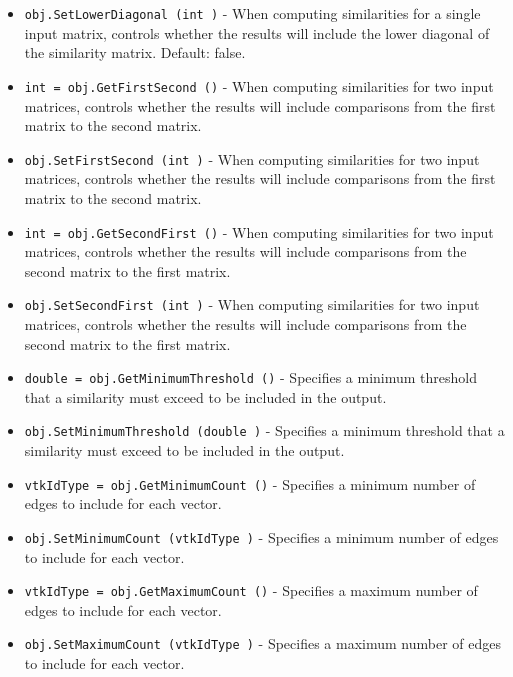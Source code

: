 \begin{itemize}
\item  \verb|obj.SetLowerDiagonal (int )| -  When computing similarities for a single input matrix, controls whether the
 results will include the lower diagonal of the similarity matrix.  Default: false.

\item  \verb|int = obj.GetFirstSecond ()| -  When computing similarities for two input matrices, controls whether the results
 will include comparisons from the first matrix to the second matrix.

\item  \verb|obj.SetFirstSecond (int )| -  When computing similarities for two input matrices, controls whether the results
 will include comparisons from the first matrix to the second matrix.

\item  \verb|int = obj.GetSecondFirst ()| -  When computing similarities for two input matrices, controls whether the results
 will include comparisons from the second matrix to the first matrix.

\item  \verb|obj.SetSecondFirst (int )| -  When computing similarities for two input matrices, controls whether the results
 will include comparisons from the second matrix to the first matrix.

\item  \verb|double = obj.GetMinimumThreshold ()| -  Specifies a minimum threshold that a similarity must exceed to be included in
 the output.

\item  \verb|obj.SetMinimumThreshold (double )| -  Specifies a minimum threshold that a similarity must exceed to be included in
 the output.

\item  \verb|vtkIdType = obj.GetMinimumCount ()| -  Specifies a minimum number of edges to include for each vector.

\item  \verb|obj.SetMinimumCount (vtkIdType )| -  Specifies a minimum number of edges to include for each vector.

\item  \verb|vtkIdType = obj.GetMaximumCount ()| -  Specifies a maximum number of edges to include for each vector.

\item  \verb|obj.SetMaximumCount (vtkIdType )| -  Specifies a maximum number of edges to include for each vector.

\end{itemize}

